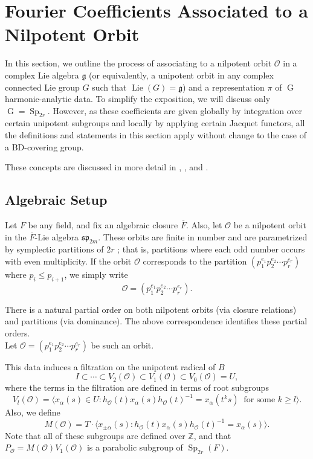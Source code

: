 \documentclass[11pt,reqno]{amsart}
\theoremstyle{definition}
\theoremstyle{remark}
\theoremstyle{definition}
\begin{document}
\section{Fourier Coefficients Associated to a Nilpotent Orbit}\label{Section: Fourier}
In this section, we outline the process of associating to a nilpotent orbit ${\mathcal{O}}$ in a complex Lie algebra ${\mathfrak g}$ (or equivalently, a unipotent orbit in any complex connected Lie group $G$ such that $\operatorname{Lie}(G)={\mathfrak g}$) and a representation $\pi$ of $\operatorname{G}$ harmonic-analytic data. To simplify the exposition, we will discuss only $\operatorname{G}=\operatorname{Sp}_{2r}$.  However, as these coefficients are given globally by integration over certain unipotent subgroups and locally by applying certain Jacquet functors, all the definitions and statements in this section apply without change to the case of a BD-covering group.

These concepts are discussed in more detail in \cite{G1}, \cite{M}, and \cite{MW1}. 
\subsection{Algebraic Setup}
Let $F$ be any field, and fix an algebraic closure $\overline{F}$. Also, let ${\mathcal{O}}$ be a nilpotent orbit in the $\overline{F}$-Lie algebra $\mathfrak{sp}_{2m}$. These orbits are finite in number and are parametrized by symplectic partitions of $2r$ \cite{CM}; that is, partitions  where each odd number occurs with even multiplicity. If the orbit ${\mathcal{O}}$ corresponds to the partition $(p_1^{e_1}p_2^{e_2}\cdots p_r^{e_r})$ where $p_i\leq p_{i+1}$, we simply write
\[
{\mathcal{O}}=(p_1^{e_1}p_2^{e_2}\cdots p_r^{e_r}).
\]

There is a natural partial order on both nilpotent orbits (via closure relations) and partitions (via dominance). The above correspondence identifies these partial orders.\\

Let ${\mathcal{O}}=(p_1^{e_1}p_2^{e_2}\cdots p_r^{e_r})$ be such an orbit. 

This data induces a filtration on the unipotent radical of $B$ 
\[
I\subset\cdots \subset V_2({\mathcal{O}})\subset V_1({\mathcal{O}}) \subset V_0({\mathcal{O}})= U,
\]
where the terms in the filtration are defined in terms of root subgroups
\[
V_l({\mathcal{O}}) = {\langle} x_{\alpha}(s) \in U : h_{\mathcal{O}}(t) x_{\alpha}(s) h_{\mathcal{O}}(t)^{-1} = x_{\alpha}(t^ks)\:\mbox{ for some } k\geq l{\rangle}.
\]
Also, we define 
\[
M({\mathcal{O}}) = T\cdot {\langle} x_{\pm{\alpha}}(s) :  h_{\mathcal{O}}(t) x_{\alpha}(s) h_{\mathcal{O}}(t)^{-1} = x_{\alpha}(s){\rangle}.
\]
Note that all of these subgroups are defined over ${\mathbb Z}$, and that $P_{\mathcal{O}} =M({\mathcal{O}})V_1({\mathcal{O}})$ is a parabolic subgroup of $\operatorname{Sp}_{2r}(F)$.
\end{document}
